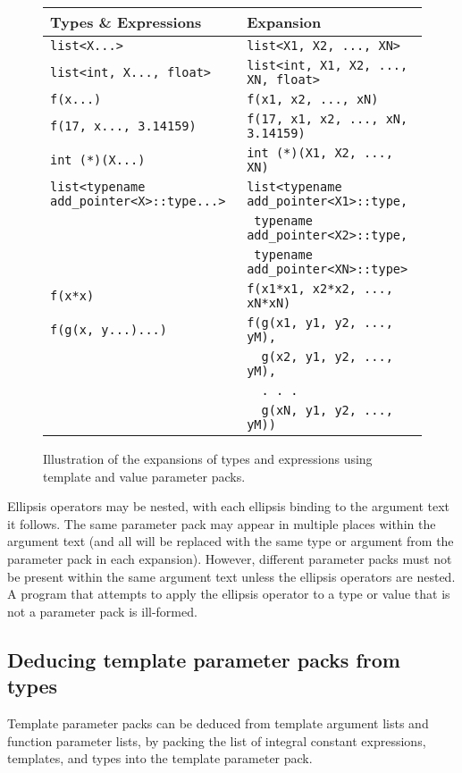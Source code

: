 \documentclass{article}
\begin{document}
\begin{figure}[h]
\centering
\begin{tabular}{l|l}
\textbf{Types \& Expressions} & \textbf{Expansion} \\\hline
\texttt{list<X...>} & \texttt{list<X1, X2, ..., XN>} \\
\texttt{list<int, X..., float>} & \texttt{list<int, X1, X2, ..., XN,
  float>} \\
\texttt{f(x...)} & \texttt{f(x1, x2, ..., xN)} \\
\texttt{f(17, x..., 3.14159)} & \texttt{f(17, x1, x2, ..., xN,
  3.14159)} \\
\texttt{int (*)(X...)} & \texttt{int (*)(X1, X2, ..., XN)} \\
\texttt{list<typename add\_pointer<X>::type...>} &
\texttt{list<typename add\_pointer<X1>::type,} \\
& \qquad\texttt{{ }typename add\_pointer<X2>::type,} \\
& \qquad\texttt{{ }typename add\_pointer<XN>::type>} \\

\texttt{f(x*x)} & \texttt{f(x1*x1, x2*x2, ..., xN*xN)} \\
\texttt{f(g(x, y...)...)} & \texttt{f(g(x1, y1, y2, ..., yM),} \\
& \texttt{{ }{ }g(x2, y1, y2, ..., yM),} \\
& \texttt{{ }{ }. . .} \\
& \texttt{{ }{ }g(xN, y1, y2, ..., yM))} \\
\end{tabular}
\caption{Illustration of the expansions of types and
  expressions using template and value parameter packs.}
\label{fig:expansions}
\end{figure}

Ellipsis operators may be nested, with each ellipsis binding to the
argument text it follows. The same parameter pack may appear in
multiple places within the argument text (and all will be replaced
with the same type or argument from the parameter pack in each
expansion). However, different parameter packs must not be present
within the same argument text unless the ellipsis operators are
nested. A program that attempts to apply the ellipsis operator to a
type or value that is not a parameter pack is ill-formed.

\subsection{Deducing template parameter packs from types}
Template parameter packs can be deduced from template argument lists
and function parameter lists, by packing the list of integral constant
expressions, templates, and types into the template parameter pack.
\end{document}
